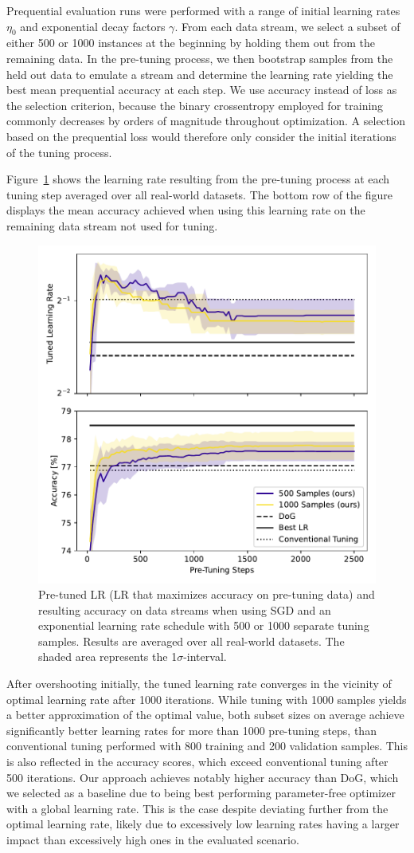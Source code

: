 \documentclass[runningheads]{llncs}
\begin{document}
Prequential evaluation runs were performed with a range of initial learning rates $\eta_0$ and exponential decay factors $\gamma$.
From each data stream, we select a subset of either 500 or 1000 instances at the beginning by holding them out from the remaining data.
In the pre-tuning process, we then bootstrap samples from the held out data to emulate a stream and determine the learning rate yielding the best mean prequential accuracy at each step.
We use accuracy instead of loss as the selection criterion, because the binary crossentropy employed for training commonly decreases by orders of magnitude throughout optimization.
A selection based on the prequential loss would therefore only consider the initial iterations of the tuning process.

Figure~\ref{fig:pretune_lr_accuracy} shows the learning rate resulting from the pre-tuning process at each tuning step averaged over all real-world datasets.
The bottom row of the figure displays the mean accuracy achieved when using this learning rate on the remaining data stream not used for tuning.

\begin{figure}[ht]
	\centering
	\includegraphics[width=.45\textwidth]{figures/pretune_1x64_acc_lr_exp_schedule.pdf}
	\caption{Pre-tuned LR (LR that maximizes accuracy on pre-tuning data) and resulting accuracy on data streams when using SGD and an exponential learning rate schedule with 500 or 1000 separate tuning samples. Results are averaged over all real-world datasets. The shaded area represents the 1$\sigma$-interval.}\label{fig:pretune_lr_accuracy}
\end{figure}

After overshooting initially, the tuned learning rate converges in the vicinity of optimal learning rate after 1000 iterations.
While tuning with 1000 samples yields a better approximation of the optimal value, both subset sizes on average achieve significantly better learning rates for more than 1000 pre-tuning steps, than conventional tuning performed with 800 training and 200 validation samples.
This is also reflected in the accuracy scores, which exceed conventional tuning after 500 iterations.
Our approach achieves notably higher accuracy than DoG, which we selected as a baseline due to being best performing parameter-free optimizer with a global learning rate.
This is the case despite deviating further from the optimal learning rate, likely due to excessively low learning rates having a larger impact than excessively high ones in the evaluated scenario.
\end{document}
